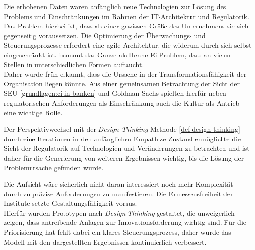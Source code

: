 Die erhobenen Daten waren anfänglich neue Technologien zur Lösung des Problems und Einschränkungen im Rahmen der IT-Architektur und Regulatorik. Das Problem hierbei ist, dass ab einer gewissen Größe des Unternehmens sie sich gegenseitig voraussetzen. Die Optimierung der Überwachungs- und Steuerungsprozesse erfordert eine agile Architektur, die widerum durch sich selbst eingeschränkt ist. \citet{Ganswindt2006} benennt das Ganze als Henne-Ei Problem, dass an vielen Stellen in unterschiedlichen Formen auftaucht.
\medskip
\\
Daher wurde früh erkannt, dass die Ursache in der Transformationsfähigkeit der Organisation liegen könnte. Aus einer gemeinsamen Betrachtung der Sicht der \ac{SEU} \ref{grundlagen:ci-in-banken} und Goldman Sachs \cite{Gupta:2017} spielten hierfür neben regulatorischen Anforderungen als Einschränkung auch die Kultur als Antrieb eine wichtige Rolle.

Der Perspektivwechsel mit der \emph{Design-Thinking} Methode \ref{def-design-thinking} durch eine Iterationen in den anfänglichen Empathize Zustand ermöglichte die Sicht der Regulatorik auf Technologien und Veränderungen zu betrachten und ist daher für die Generierung von weiteren Ergebnissen wichtig, bis die Lösung der Problemursache gefunden wurde.

Die Aufsicht wäre sicherlich nicht daran interessiert noch mehr Komplexität durch zu präzise Anforderungen zu manifestieren. Die Ermessensfreiheit der Institute setzte Gestaltungsfähigkeit voraus.
\medskip
\\
Hierfür wurden Prototypen nach \emph{Design-Thinking} gestaltet, die unweigerlich zeigen, dass antreibende Anlagen zur Innovationsförderung wichtig sind. Für die Priorisierung hat fehlt dabei ein klares Steuerungsprozess, daher wurde das Modell mit den dargestellten Ergebnissen kontinuierlich verbessert.


